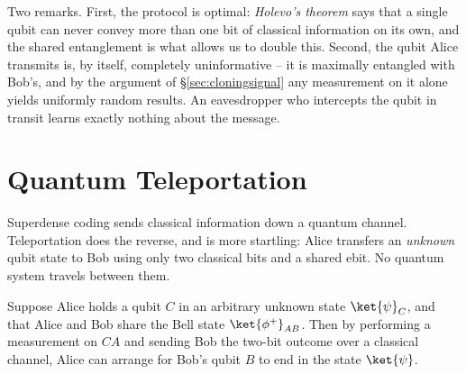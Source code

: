 Two remarks. First, the protocol is optimal: \emph{Holevo's theorem} says that a single qubit can never convey more than one bit of classical information on its own, and the shared entanglement is what allows us to double this. Second, the qubit Alice transmits is, by itself, completely uninformative -- it is maximally entangled with Bob's, and by the argument of \S\ref{sec:cloningsignal} any measurement on it alone yields uniformly random results. An eavesdropper who intercepts the qubit in transit learns exactly nothing about the message.

\section{Quantum Teleportation}\label{sec:teleport}

Superdense coding sends classical information down a quantum channel. Teleportation does the reverse, and is more startling: Alice transfers an \emph{unknown} qubit state to Bob using only two classical bits and a shared ebit. No quantum system travels between them.

\begin{theorem}
	Suppose Alice holds a qubit $C$ in an arbitrary unknown state $\ket{\psi}_C$, and that Alice and Bob share the Bell state $\ket{\phi^+}_{AB}$. Then by performing a measurement on $CA$ and sending Bob the two-bit outcome over a classical channel, Alice can arrange for Bob's qubit $B$ to end in the state $\ket{\psi}$.
\end{theorem}

